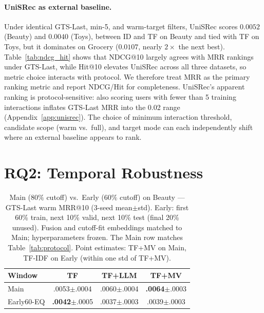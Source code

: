 \documentclass[sigconf,natbib=true,anonymous]{acmart}
\newcommand{\tfidf}{\textsc{TF-IDF}\xspace}
\newcommand{\tfmv}{\textsc{TF+MV}\xspace}
\begin{document}
\paragraph{UniSRec as external baseline.}
Under identical GTS-Last, min-5, and warm-target filters, UniSRec scores $0.0052$ (Beauty) and $0.0040$ (Toys), between ID and TF on Beauty and tied with TF on Toys, but it dominates on Grocery ($0.0107$, nearly $2\times$ the next best).
Table~\ref{tab:ndcg_hit} shows that NDCG@10 largely agrees with MRR rankings under GTS-Last, while Hit@10 elevates UniSRec across all three datasets, so metric choice interacts with protocol.
We therefore treat MRR as the primary ranking metric and report NDCG/Hit for completeness.
UniSRec's apparent ranking is protocol-sensitive: also scoring users with fewer than 5 training interactions inflates GTS-Last MRR into the 0.02 range (Appendix~\ref{app:unisrec}).
The choice of minimum interaction threshold, candidate scope (warm vs.\ full), and target mode can each independently shift where an external baseline appears to rank.

\section{RQ2: Temporal Robustness}
\label{sec:rq2}

\begin{table}[t]
\centering
\caption{%
Main ($80\%$ cutoff) vs.\ Early ($60\%$ cutoff) on Beauty --- GTS-Last warm MRR@10 (3-seed mean$\pm$std).
Early: first 60\% train, next 10\% valid, next 10\% test (final 20\% unused).
Fusion and cutoff-fit embeddings matched to Main; hyperparameters frozen.
The Main row matches Table~\ref{tab:protocol}.
Point estimates: \tfmv{} on Main, \tfidf{} on Early (within one std of \tfmv).%
}
\label{tab:early}
\small
\begin{tabular}{@{}lccc@{}}
\toprule
Window & TF & TF+LLM & TF+MV \\
\midrule
Main      & .0053\tiny{$\pm$.0004} & .0060\tiny{$\pm$.0004} & \textbf{.0064}\tiny{$\pm$.0003} \\
Early60-EQ & \textbf{.0042}\tiny{$\pm$.0005} & .0037\tiny{$\pm$.0003} & .0039\tiny{$\pm$.0003} \\
\bottomrule
\end{tabular}
\end{table}
\end{document}
